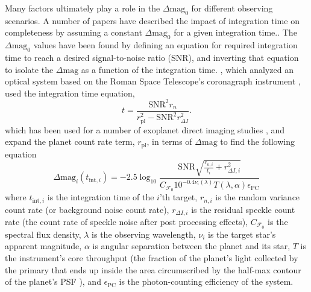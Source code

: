 Many factors ultimately play a role in the $\Delta\textrm{mag}_0$ for different
observing scenarios. A number of papers have described the impact of
integration time on completeness by assuming a constant $\Delta\textrm{mag}_0$
for a given integration time.\citep{hunyadiSingleVisitCompleteness2005,
brownNewCompletenessMethods2010, starkMaximizingExoEarthCandidate2014,
keithlyOptimalScheduling2020}. The $\Delta\textrm{mag}_0$ values have been
found by defining an equation for required integration time to reach a desired
signal-to-noise ratio (SNR), and inverting that equation to isolate the
$\Delta\textrm{mag}$ as a function of the integration time.
\citet{keithlyOptimalScheduling2020}, which analyzed an optical system based on
the Roman Space Telescope's coronagraph instrument \citep{Nemati2014}, used the
integration time equation, 
\begin{equation}
  t = \frac{\textrm{SNR}^2 r_n}{r^2_\textrm{pl} - \textrm{SNR}^2 r^2_{\Delta I}}.
  \label{eq:2020t}
\end{equation}
which has been used for a number of exoplanet direct imaging studies
\citep{nematiSensitivityWFIRST2017, delacroixScienceYield2016,
savranskyMultimissionModeling2017}, and expand the planet count rate term,
$r_\textrm{pl}$, in terms of $\Delta\textrm{mag}$ to find the following
equation
\begin{equation}
  \Delta\textrm{mag}_i(t_{\textrm{int},i}) = -2.5 \log_{10} \frac{\textrm{SNR} \sqrt{\frac{r_{n,i}
    }{t_i} + r^2_{\Delta I, i} }}{C_{\mathcal{F}_0} 10^{-0.4 \nu_i (\lambda)}
T(\lambda, \alpha) \epsilon_{\textrm{PC}}}
  \label{eq:dean_dmag}
\end{equation}
where $t_{\textrm{int},i}$ is the integration time of the $i$'th target,
$r_{n,i}$ is the random variance count rate (or background noise count rate),
$r_{\Delta I,i}$ is the residual speckle count rate (the count rate of speckle noise after post processing effects),
$C_{\mathcal{F}_0}$ is the spectral flux density,
$\lambda$ is the observing wavelength,
$\nu_i$ is the target star's apparent magnitude,
$\alpha$ is angular separation between the planet and its star,
$T$ is the instrument's core throughput (the fraction of the planet's light collected by
the primary that ends up inside the area circumscribed by the half-max contour
of the planet's PSF \citep{Nemati2020a}), and $\epsilon_{\textrm{PC}}$ is the
photon-counting efficiency of the system.

